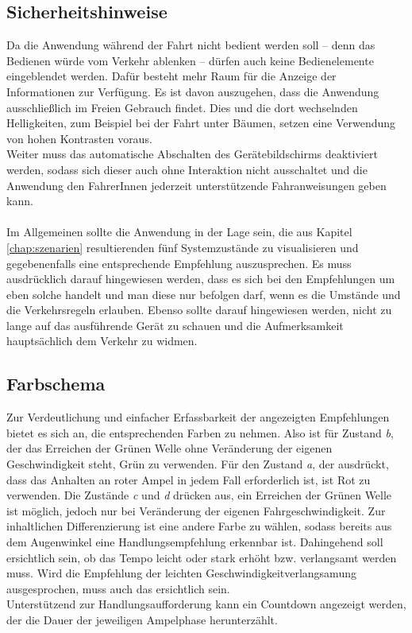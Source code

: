 \subsection{Sicherheitshinweise}
Da die Anwendung während der Fahrt nicht bedient werden soll -- denn das Bedienen würde vom Verkehr ablenken -- dürfen auch keine Bedienelemente eingeblendet werden. Dafür besteht mehr Raum für die Anzeige der Informationen zur Verfügung. 
Es ist davon auszugehen, dass die Anwendung ausschließlich im Freien Gebrauch findet. Dies und die dort wechselnden Helligkeiten, zum Beispiel bei der Fahrt unter Bäumen, setzen eine Verwendung von hohen Kontrasten voraus.\\ 
Weiter muss das automatische Abschalten des Gerätebildschirms deaktiviert werden, sodass sich dieser auch ohne Interaktion nicht ausschaltet und die Anwendung den FahrerInnen jederzeit unterstützende Fahranweisungen geben kann. \\\\
Im Allgemeinen sollte die Anwendung in der Lage sein, die aus Kapitel \ref{chap:szenarien} resultierenden fünf Systemzustände zu visualisieren und gegebenenfalls eine entsprechende Empfehlung auszusprechen. Es muss ausdrücklich darauf hingewiesen werden, dass es sich bei den Empfehlungen um eben solche handelt und man diese nur befolgen darf, wenn es die Umstände und die Verkehrsregeln erlauben. Ebenso sollte darauf hingewiesen werden, nicht zu lange auf das ausführende Gerät zu schauen und die Aufmerksamkeit hauptsächlich dem Verkehr zu widmen.
\subsection{Farbschema}
Zur Verdeutlichung und einfacher Erfassbarkeit der angezeigten Empfehlungen bietet es sich an, die entsprechenden Farben zu nehmen. Also ist für Zustand \textit{b}, der das Erreichen der Grünen Welle ohne Veränderung der eigenen Geschwindigkeit steht, Grün zu verwenden. Für den Zustand \textit{a}, der ausdrückt, dass das Anhalten an roter Ampel in jedem Fall erforderlich ist, ist Rot zu verwenden.
Die Zustände \textit{c} und \textit{d} drücken aus, ein Erreichen der Grünen Welle ist möglich, jedoch nur bei Veränderung der eigenen Fahrgeschwindigkeit. Zur inhaltlichen Differenzierung ist eine andere Farbe zu wählen, sodass bereits aus dem Augenwinkel eine Handlungsempfehlung erkennbar ist. Dahingehend soll ersichtlich sein, ob das Tempo leicht oder stark erhöht bzw. verlangsamt werden muss. Wird die Empfehlung der leichten Geschwindigkeitverlangsamung ausgesprochen, muss auch das ersichtlich sein.\\
Unterstützend zur Handlungsaufforderung kann ein Countdown angezeigt werden, der die Dauer der jeweiligen Ampelphase herunterzählt. 
